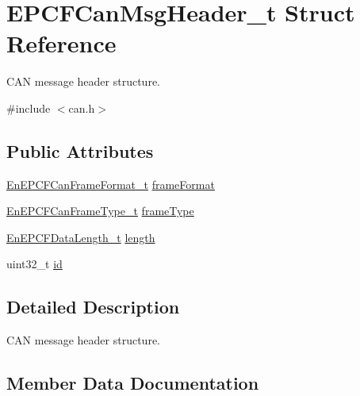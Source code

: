 \hypertarget{structEPCFCanMsgHeader__t}{}\section{E\+P\+C\+F\+Can\+Msg\+Header\+\_\+t Struct Reference}
\label{structEPCFCanMsgHeader__t}


C\+AN message header structure.  




{\ttfamily \#include $<$can.\+h$>$}

\subsection*{Public Attributes}
\begin{DoxyCompactItemize}
\item 
\mbox{\hyperlink{can_8h_a5edf07e1dd389b138138a38d7b513eb3}{En\+E\+P\+C\+F\+Can\+Frame\+Format\+\_\+t}} \mbox{\hyperlink{structEPCFCanMsgHeader__t_a76efcf8bc5f6ec5c88d46c66c91b10ff}{frame\+Format}}
\item 
\mbox{\hyperlink{can_8h_a3ba32a3cfd614cbd886a7c62b692defc}{En\+E\+P\+C\+F\+Can\+Frame\+Type\+\_\+t}} \mbox{\hyperlink{structEPCFCanMsgHeader__t_aa62b2d4a72a8c7251efc3b54296a5e38}{frame\+Type}}
\item 
\mbox{\hyperlink{can_8h_a1a558e4259c2520bc9727ff9a8941fac}{En\+E\+P\+C\+F\+Data\+Length\+\_\+t}} \mbox{\hyperlink{structEPCFCanMsgHeader__t_ae2e652a36b29fcb32ac8581e59114d08}{length}}
\item 
uint32\+\_\+t \mbox{\hyperlink{structEPCFCanMsgHeader__t_ab65259bd2e786aa9842f0b2dc23b394b}{id}}
\end{DoxyCompactItemize}


\subsection{Detailed Description}
C\+AN message header structure. 

\subsection{Member Data Documentation}
\mbox{\label{structEPCFCanMsgHeader__t_a76efcf8bc5f6ec5c88d46c66c91b10ff}} 
